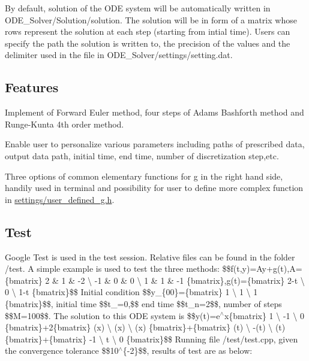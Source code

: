 By default, solution of the O\+DE system will be automatically written in {\ttfamily O\+D\+E\+\_\+\+Solver/\+Solution/solution}. The solution will be in form of a matrix whose rows represent the solution at each step (starting from intial time). Users can specify the path the solution is written to, the precision of the values and the delimiter used in the file in {\ttfamily O\+D\+E\+\_\+\+Solver/settings/setting.\+dat}. ~\newline
 \paragraph*{}

\subsection*{Features}


\begin{DoxyItemize}
\item Implement of Forward Euler method, four steps of Adams Bashforth method and Runge-\/\+Kunta 4th order method.
\item Enable user to personalize various parameters including paths of prescribed data, output data path, initial time, end time, number of discretization step,etc.
\item Three options of common elementary functions for g in the right hand side, handily used in terminal and possibility for user to define more complex function in {\ttfamily \mbox{\hyperlink{user__defined__g_8h_source}{settings/user\+\_\+defined\+\_\+g.\+h}}}.
\end{DoxyItemize}

\subsection*{Test}

Google Test is used in the test session. Relative files can be found in the folder {\ttfamily /test}. A simple example is used to test the three methods\+: \$\$f(t,y)=Ay+g(t),A=\{bmatrix\} 2 \& 1 \& -\/2 \textbackslash{} -\/1 \& 0 \& 0 \textbackslash{} 1 \& 1 \& -\/1 \{bmatrix\},g(t)=\{bmatrix\} 2-\/t \textbackslash{} 0 \textbackslash{} 1-\/t \{bmatrix\}\$\$ Initial condition \$\$y\+\_\+\{00\}=\{bmatrix\} 1 \textbackslash{} 1 \textbackslash{} 1 \{bmatrix\}\$\$, initial time \$\$t\+\_=0,\$\$ end time \$\$t\+\_\+n=2\$\$, number of steps \$\$M=100\$\$. The solution to this O\+DE system is \$\$y(t)=e$^\wedge$x\{bmatrix\} 1 \textbackslash{} -\/1 \textbackslash{} 0 \{bmatrix\}+2\{bmatrix\} (x) \textbackslash{} (x) \textbackslash{} (x) \{bmatrix\}+\{bmatrix\} (t) \textbackslash{} -\/(t) \textbackslash{} (t) \{bmatrix\}+\{bmatrix\} -\/1 \textbackslash{} t \textbackslash{} 0 \{bmatrix\}\$\$ Running file {\ttfamily /test/test.cpp}, given the convergence tolerance \$\$10$^\wedge$\{-\/2\}\$\$, results of test are as below\+:


